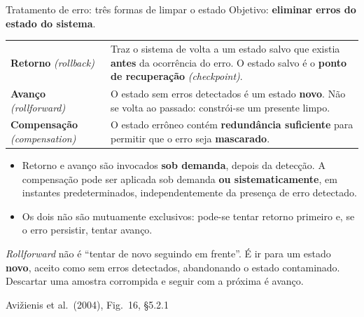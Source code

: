 \documentclass{beamer}
\newcommand{\en}[1]{{\color{depCinza}\textit{#1}}}
\newcommand{\sect}[1]{\par\smallskip\hfill{\tiny\color{black!55}Avi\v{z}ienis et al.\ (2004), #1}}
\begin{document}
\begin{frame}{Tratamento de erro: tr\^es formas de limpar o estado}
    \footnotesize
    Objetivo: \textbf{eliminar erros do estado do sistema}.
    \medskip
    \begin{tabularx}{\linewidth}{@{}p{3.2cm} >{\raggedright\arraybackslash}X@{}}
        \toprule
        \textbf{Retorno} \en{(rollback)} & Traz o sistema de volta a um estado salvo que existia \textbf{antes} da ocorr\^encia do erro. O estado salvo \'e o \textbf{ponto de recupera\c{c}\~ao} \en{(checkpoint)}. \\
        \addlinespace
        \textbf{Avan\c{c}o} \en{(rollforward)} & O estado sem erros detectados \'e um estado \textbf{novo}. N\~ao se volta ao passado: constr\'oi-se um presente limpo. \\
        \addlinespace
        \textbf{Compensa\c{c}\~ao} \en{(compensation)} & O estado err\^oneo cont\'em \textbf{redund\^ancia suficiente} para permitir que o erro seja \textbf{mascarado}. \\
        \bottomrule
    \end{tabularx}
    \medskip
    \begin{itemize}
        \item Retorno e avan\c{c}o s\~ao invocados \textbf{sob demanda}, depois da detec\c{c}\~ao. A compensa\c{c}\~ao pode ser aplicada sob demanda \textbf{ou sistematicamente}, em instantes predeterminados, independentemente da presen\c{c}a de erro detectado.
        \item Os dois n\~ao s\~ao mutuamente exclusivos: pode-se tentar retorno primeiro e, se o erro persistir, tentar avan\c{c}o.
    \end{itemize}
    \medskip
    \begin{armadilha}
        \scriptsize
        \textit{Rollforward} n\~ao \'e ``tentar de novo seguindo em frente''. \'E ir para um estado \textbf{novo}, aceito como sem erros detectados, abandonando o estado contaminado. Descartar uma amostra corrompida e seguir com a pr\'oxima \'e avan\c{c}o.
    \end{armadilha}
    \sect{Fig.\ 16, \S5.2.1}
\end{frame}
\end{document}
